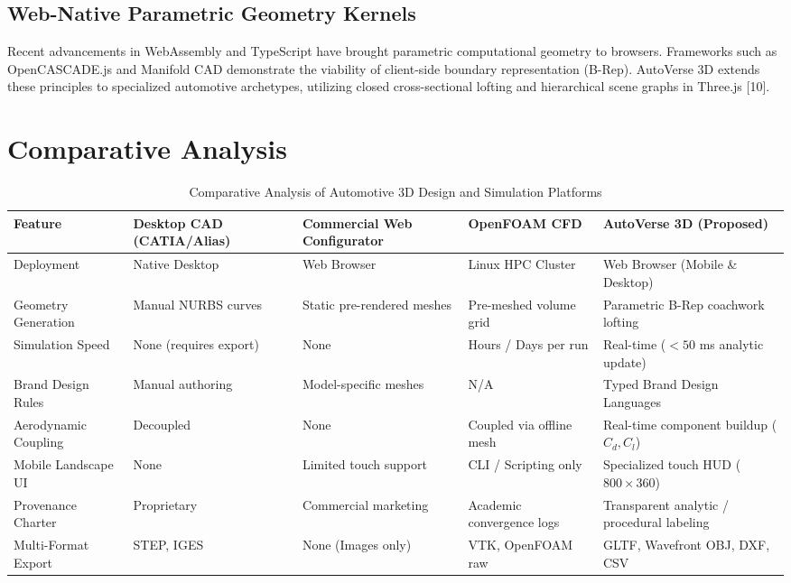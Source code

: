 \documentclass[12pt,a4paper]{report}
\begin{document}
\subsection{Web-Native Parametric Geometry Kernels}
Recent advancements in WebAssembly and TypeScript have brought parametric computational geometry to browsers. Frameworks such as OpenCASCADE.js and Manifold CAD demonstrate the viability of client-side boundary representation (B-Rep). AutoVerse 3D extends these principles to specialized automotive archetypes, utilizing closed cross-sectional lofting and hierarchical scene graphs in Three.js [10].

\section{Comparative Analysis}

\begin{table}[htbp]
\centering
\small
\caption{Comparative Analysis of Automotive 3D Design and Simulation Platforms}
\label{tab:lit_comparison}
\renewcommand{\arraystretch}{1.3}
\begin{tabularx}{\textwidth}{|>{\raggedright\arraybackslash}p{2.6cm}|>{\raggedright\arraybackslash}X|>{\raggedright\arraybackslash}X|>{\raggedright\arraybackslash}X|>{\raggedright\arraybackslash}X|}
\hline
\textbf{Feature} & \textbf{Desktop CAD (CATIA/Alias)} & \textbf{Commercial Web Configurator} & \textbf{OpenFOAM CFD} & \textbf{AutoVerse 3D (Proposed)} \\
\hline
Deployment & Native Desktop & Web Browser & Linux HPC Cluster & Web Browser (Mobile \& Desktop) \\
\hline
Geometry Generation & Manual NURBS curves & Static pre-rendered meshes & Pre-meshed volume grid & Parametric B-Rep coachwork lofting \\
\hline
Simulation Speed & None (requires export) & None & Hours / Days per run & Real-time ($< 50$ ms analytic update) \\
\hline
Brand Design Rules & Manual authoring & Model-specific meshes & N/A & 24 Typed Brand Design Languages \\
\hline
Aerodynamic Coupling & Decoupled & None & Coupled via offline mesh & Real-time component buildup ($C_d, C_l$) \\
\hline
Mobile Landscape UI & None & Limited touch support & CLI / Scripting only & Specialized touch HUD ($800\times360$) \\
\hline
Provenance Charter & Proprietary & Commercial marketing & Academic convergence logs & Transparent analytic / procedural labeling \\
\hline
Multi-Format Export & STEP, IGES & None (Images only) & VTK, OpenFOAM raw & GLTF, Wavefront OBJ, DXF, CSV \\
\hline
\end{tabularx}
\end{table}
\end{document}
